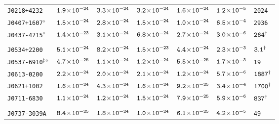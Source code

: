 \begin{longtable}{l | c | c | c | c | c | l}
\scriptsize{\tt{J0218+4232}} & \scriptsize{$\tt{1.9\!\times\!10^{-24}}$} & \scriptsize{$\tt{3.3\!\times\!10^{-24}}$} & \scriptsize{$\tt{3.2\!\times\!10^{-24}}$} &\scriptsize{$\tt{1.6\!\times\!10^{-24}}$} & \scriptsize{$\tt{1.2\!\times\!10^{-5}}$} & \scriptsize{\tt{2024}} \\[-16pt] 
\scriptsize{\tt{J0407+1607}$^{\diamond}$} & \scriptsize{$\tt{1.5\!\times\!10^{-24}}$} &
\scriptsize{$\tt{2.8\!\times\!10^{-24}}$} & \scriptsize{$\tt{1.5\!\times\!10^{-24}}$} &\scriptsize{$\tt{1.0\!\times\!10^{-24}}$} &
\scriptsize{$\tt{6.5\!\times\!10^{-4}}$} & \scriptsize{\tt{2936}} \\[-16pt] 
\scriptsize{\tt{J0437-4715}$^{\diamond}$} & \scriptsize{$\tt{1.4\!\times\!10^{-23}}$} &
\scriptsize{$\tt{3.1\!\times\!10^{-24}}$} & \scriptsize{$\tt{6.8\!\times\!10^{-24}}$} & \scriptsize{$\tt{2.7\!\times\!10^{-24}}$}
& \scriptsize{$\tt{3.0\!\times\!10^{-6}}$} & \scriptsize{$\tt{264^{\dagger}}$} \\[-16pt] 
\\[-20pt] 
\scriptsize{\tt{J0534+2200}} & \scriptsize{$\tt{5.1\!\times\!10^{-24}}$} & \scriptsize{$\tt{8.2\!\times\!10^{-24}}$} & \scriptsize{$\tt{1.5\!\times\!10^{-23}}$} & \scriptsize{$\tt{4.4\!\times\!10^{-24}}$} & \scriptsize{$\tt{2.3\!\times\!10^{-3}}$} & \scriptsize{$\tt{3.1^{\dagger}}$} \\[-16pt] 
\scriptsize{\tt{J0537-6910}$^{\ddagger\diamond}$} & \scriptsize{$\tt{4.7\!\times\!10^{-25}}$} &
\scriptsize{$\tt{1.1\!\times\!10^{-24}}$} & \scriptsize{$\tt{1.2\!\times\!10^{-24}}$} &\scriptsize{$\tt{5.5\!\times\!10^{-25}}$} &
\scriptsize{$\tt{1.7\!\times\!10^{-3}}$} & \scriptsize{\tt{19}} \\[-16pt] 
\scriptsize{\tt{J0613-0200}} & \scriptsize{$\tt{2.2\!\times\!10^{-24}}$} & \scriptsize{$\tt{2.0\!\times\!10^{-24}}$} & \scriptsize{$\tt{2.1\!\times\!10^{-24}}$} & \scriptsize{$\tt{1.2\!\times\!10^{-24}}$} & \scriptsize{$\tt{5.7\!\times\!10^{-6}}$} & \scriptsize{$\tt{1887^{\dagger}}$} \\[-16pt] 
\scriptsize{\tt{J0621+1002}} & \scriptsize{$\tt{1.6\!\times\!10^{-24}}$} & \scriptsize{$\tt{4.3\!\times\!10^{-24}}$} & \scriptsize{$\tt{1.6\!\times\!10^{-24}}$} & \scriptsize{$\tt{9.2\!\times\!10^{-25}}$} & \scriptsize{$\tt{3.4\!\times\!10^{-4}}$} & \scriptsize{$\tt{1700^{\dagger}}$} \\[-16pt] 
\scriptsize{\tt{J0711-6830}} & \scriptsize{$\tt{1.1\!\times\!10^{-24}}$} & \scriptsize{$\tt{1.2\!\times\!10^{-24}}$} & \scriptsize{$\tt{1.5\!\times\!10^{-24}}$} & \scriptsize{$\tt{7.9\!\times\!10^{-25}}$} & \scriptsize{$\tt{5.9\!\times\!10^{-6}}$} & \scriptsize{$\tt{837^{\dagger}}$} \\[-16pt] 
\\[-20pt] 
\scriptsize{\tt{J0737-3039A}} & \scriptsize{$\tt{8.4\!\times\!10^{-25}}$} & \scriptsize{$\tt{1.8\!\times\!10^{-24}}$} & \scriptsize{$\tt{1.0\!\times\!10^{-24}}$} &\scriptsize{$\tt{6.1\!\times\!10^{-25}}$} & \scriptsize{$\tt{4.2\!\times\!10^{-5}}$} & \scriptsize{\tt{49}} \\[-16pt] 

\end{longtable}
